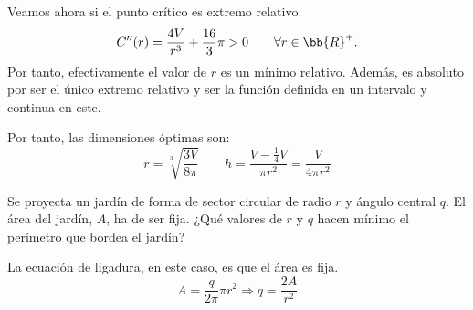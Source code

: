 \begin{ejercicio}
    Veamos ahora si el punto crítico es extremo relativo.
    \begin{equation*}
        C''(r) = \frac{4V}{r^3} +\frac{16}{3}\pi > 0 \qquad \forall r\in \bb{R}^+.
    \end{equation*}
    Por tanto, efectivamente el valor de $r$ es un mínimo relativo. Además, es absoluto por ser el único extremo relativo y ser la función definida en un intervalo y continua en este.

    Por tanto, las dimensiones óptimas son:
    \begin{equation*}
        r=\sqrt[3]{\frac{3V}{8\pi}} \qquad h=\frac{V-\frac{1}{4}V}{\pi r^2} = \frac{V}{4\pi r^2}
    \end{equation*}
\end{ejercicio}

\begin{ejercicio}
    Se proyecta un jardín de forma de sector circular de radio $r$ y ángulo central $q$. El área del jardín, $A$, ha de ser fija. ¿Qué valores de $r$ y $q$ hacen mínimo el perímetro que bordea el jardín?
    \begin{figure}[H]
        \centering
    \end{figure}

    La ecuación de ligadura, en este caso, es que el área es fija.
    \begin{equation*}
        A = \frac{q}{2\pi} \pi r^2\Longrightarrow q=\frac{2A}{r^2}
    \end{equation*}


\end{ejercicio}
